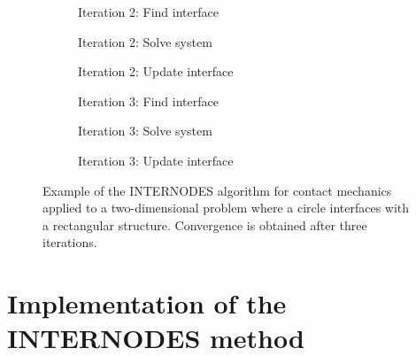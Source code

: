 \documentclass[11pt, a4paper]{article}
\begin{document}
\begin{figure}[H]
\begin{subfigure}[b]{.32\linewidth}
        \scalebox{0.8}{}
        \caption{Iteration 2: Find interface}\label{fig:example-iter1-interface}
    \end{subfigure}
    \begin{subfigure}[b]{.32\linewidth}
        \scalebox{0.8}{}
        \caption{Iteration 2: Solve system}\label{fig:example-iter1-solution}
    \end{subfigure}
    \begin{subfigure}[b]{.32\linewidth}
        \scalebox{0.8}{}
        \caption{Iteration 2: Update interface}\label{fig:example-iter1-dumping}
    \end{subfigure}
    \begin{subfigure}[b]{.32\linewidth}
        \scalebox{0.8}{}
        \caption{Iteration 3: Find interface}\label{fig:example-iter2-interface}
    \end{subfigure}
    \begin{subfigure}[b]{.32\linewidth}
        \scalebox{0.8}{}
        \caption{Iteration 3: Solve system}\label{fig:example-iter2-solution}
    \end{subfigure}
    \begin{subfigure}[b]{.32\linewidth}
        \scalebox{0.8}{}
        \caption{Iteration 3: Update interface}\label{fig:example-iter2-dumping}
    \end{subfigure}
    \caption{Example of the INTERNODES algorithm for contact mechanics applied to a two-dimensional problem where a circle interfaces with a rectangular structure. Convergence is obtained after three iterations.}
    \label{fig:example}
\end{figure}

\clearpage
\section{Implementation of the INTERNODES method}
\label{sec:implementation}
\end{document}
